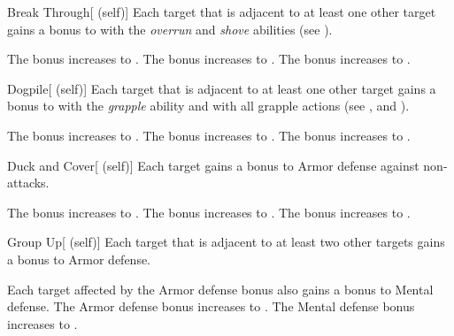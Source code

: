         {
            \begin{attuneability}{Break Through}[ (self)]
                Each target that is adjacent to at least one other target
                    gains a  bonus to  with the \textit{overrun} and \textit{shove} abilities (see ).

                \rankline
                 The bonus increases to .
                 The bonus increases to .
                 The bonus increases to .
            \end{attuneability}

            \begin{attuneability}{Dogpile}[ (self)]
                Each target that is adjacent to at least one other target
                gains a  bonus to  with the \textit{grapple} ability and with all grapple actions (see , and ).

                \rankline
                 The bonus increases to .
                 The bonus increases to .
                 The bonus increases to .
            \end{attuneability}

            \begin{attuneability}{Duck and Cover}[ (self)]
                Each target gains a  bonus to Armor defense against non- attacks.

                \rankline
                 The bonus increases to .
                 The bonus increases to .
                 The bonus increases to .
            \end{attuneability}

            \begin{attuneability}{Group Up}[ (self)]
                Each target that is adjacent to at least two other targets gains a  bonus to Armor defense.

                \rankline
                 Each target affected by the Armor defense bonus also gains a  bonus to Mental defense.
                 The Armor defense bonus increases to .
                 The Mental defense bonus increases to .
            \end{attuneability}

}
